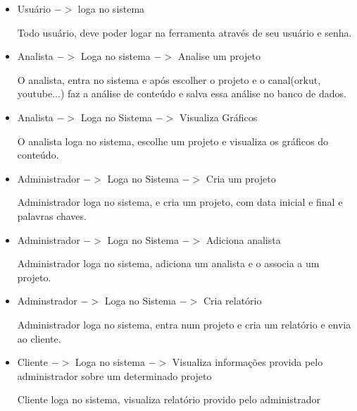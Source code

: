 \begin{itemize}
    \item Usuário $->$ loga no sistema

Todo usuário, deve poder logar na ferramenta através de seu usuário e senha.



    \item Analista $->$ Loga no sistema $->$ Analise um projeto

O analista, entra no sistema e após escolher o projeto e o
canal(orkut, youtube...) faz a análise  de conteúdo e salva essa
análise no banco de dados.


\item Analista $->$ Loga no Sistema $->$ Visualiza Gráficos

O analista loga no sistema, escolhe um projeto e visualiza os gráficos do conteúdo.



\item Administrador $->$ Loga no Sistema $->$ Cria um projeto 

Administrador loga no sistema, e cria um projeto, com data inicial e final e palavras chaves.


\item Administrador $->$ Loga no Sistema $->$ Adiciona analista

Administrador loga no sistema, adiciona um analista e o associa a um projeto.



\item Adminstrador $->$ Loga no Sistema $->$ Cria relatório

Administrador loga no sistema, entra num projeto e cria um relatório e envia ao cliente.



\item Cliente $->$ Loga no sistema $->$ Visualiza informações provida pelo administrador sobre um determinado projeto

Cliente loga no sistema, visualiza relatório provido pelo administrador

\end{itemize}
